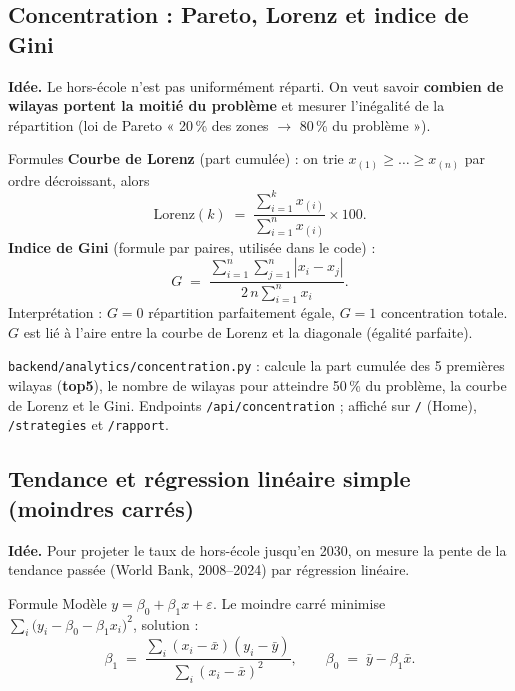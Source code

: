 \documentclass[11pt,a4paper]{article}
\newcommand{\txt}[1]{\texttt{#1}}
\begin{document}
\subsection{Concentration : Pareto, Lorenz et indice de Gini}
\label{sec:gini}

\textbf{Idée.} Le hors-école n'est pas uniformément réparti. On veut savoir
\textbf{combien de wilayas portent la moitié du problème} et mesurer
l'inégalité de la répartition (loi de Pareto « 20\,\% des zones $\to$
80\,\% du problème »).

\begin{meth}{Formules}
\textbf{Courbe de Lorenz} (part cumulée) : on trie $x_{(1)}\ge\dots\ge x_{(n)}$
par ordre décroissant, alors
\[
\text{Lorenz}(k) \;=\; \frac{\sum_{i=1}^{k}x_{(i)}}{\sum_{i=1}^{n}x_{(i)}} \times 100.
\]
\textbf{Indice de Gini} (formule par paires, utilisée dans le code) :
\[
G \;=\; \frac{\sum_{i=1}^{n}\sum_{j=1}^{n}|x_i-x_j|}
{2\,n\sum_{i=1}^{n}x_i}.
\]
Interprétation : $G=0$ répartition parfaitement égale, $G=1$ concentration
totale. $G$ est lié à l'aire entre la courbe de Lorenz et la diagonale
(égalité parfaite).
\end{meth}

\begin{where}
\txt{backend/analytics/concentration.py} : calcule la part cumulée des 5
premières wilayas (\textbf{top5}), le nombre de wilayas pour atteindre
50\,\% du problème, la courbe de Lorenz et le Gini. Endpoints
\txt{/api/concentration} ; affiché sur \txt{/} (Home), \txt{/strategies}
et \txt{/rapport}.
\end{where}

\subsection{Tendance et régression linéaire simple (moindres carrés)}
\label{sec:ols}

\textbf{Idée.} Pour projeter le taux de hors-école jusqu'en 2030, on mesure la
pente de la tendance passée (World Bank, 2008--2024) par régression linéaire.

\begin{meth}{Formule}
Modèle $y = \beta_0 + \beta_1 x + \varepsilon$. Le moindre carré minimise
$\sum_i\big(y_i - \beta_0 - \beta_1 x_i\big)^2$, solution :
\[
\beta_1 \;=\; \frac{\sum_{i}(x_i-\bar{x})(y_i-\bar{y})}
{\sum_{i}(x_i-\bar{x})^2}, \qquad
\beta_0 \;=\; \bar{y} - \beta_1\bar{x}.
\]
\end{meth}
\end{document}
